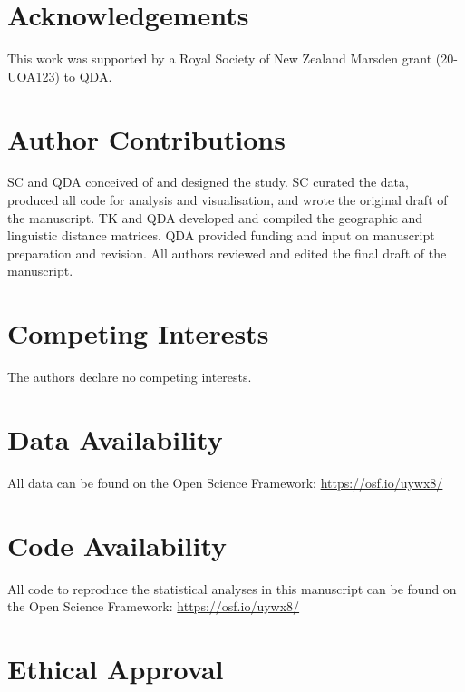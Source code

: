 \documentclass[
  man,floatsintext]{apa6}
\begin{document}
\newpage

\hypertarget{acknowledgements}{%
\section{Acknowledgements}\label{acknowledgements}}

This work was supported by a Royal Society of New Zealand Marsden grant (20-UOA123) to QDA.

\hypertarget{author-contributions}{%
\section{Author Contributions}\label{author-contributions}}

SC and QDA conceived of and designed the study. SC curated the data, produced all code for analysis and visualisation, and wrote the original draft of the manuscript. TK and QDA developed and compiled the geographic and linguistic distance matrices. QDA provided funding and input on manuscript preparation and revision. All authors reviewed and edited the final draft of the manuscript.

\hypertarget{competing-interests}{%
\section{Competing Interests}\label{competing-interests}}

The authors declare no competing interests.

\hypertarget{data-availability}{%
\section{Data Availability}\label{data-availability}}

All data can be found on the Open Science Framework: \url{https://osf.io/uywx8/}

\hypertarget{code-availability}{%
\section{Code Availability}\label{code-availability}}

All code to reproduce the statistical analyses in this manuscript can be found on the Open Science Framework: \url{https://osf.io/uywx8/}

\hypertarget{ethical-approval}{%
\section{Ethical Approval}\label{ethical-approval}}
\end{document}
